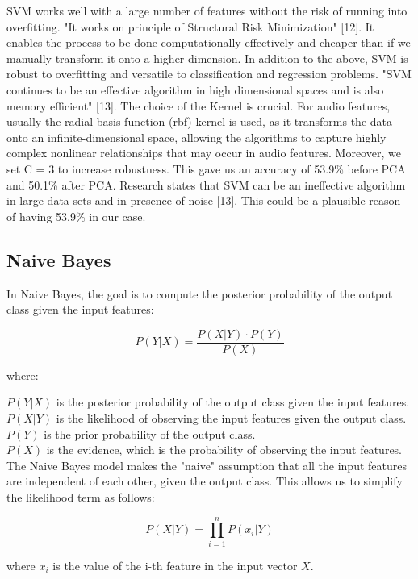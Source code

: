 \documentclass[conference]{IEEEtran}
\begin{document}
SVM works well with a large number of features without the risk of running into overfitting. "It works on principle of Structural Risk Minimization" [12]. It enables the process to be done computationally effectively and cheaper than if we manually transform it onto a higher dimension. In addition to the above, SVM is robust to overfitting and versatile to classification and regression problems.
"SVM continues to be an effective algorithm in high dimensional spaces and is also memory efficient" [13].
The choice of the Kernel is crucial. For audio features, usually the radial-basis function (rbf) kernel is used, as it transforms the data onto an infinite-dimensional space, allowing the algorithms to capture highly complex nonlinear relationships that may occur in audio features. Moreover, we set C = 3 to increase robustness. This gave us an accuracy of 53.9\% before PCA and 50.1\% after PCA.
Research states that SVM can be an ineffective algorithm in large data sets and in presence of noise [13]. This could be a plausible reason of having 53.9\% in our case.

\subsection{Naive Bayes}
In Naive Bayes, the goal is to compute the posterior probability of the output class given the input features:

\begin{equation}
P(Y|X) = \frac{P(X|Y) \cdot P(Y)}{P(X)}
\end{equation}

where:

$P(Y|X)$ is the posterior probability of the output class given the input features. \\
$P(X|Y)$ is the likelihood of observing the input features given the output class. \\
$P(Y)$ is the prior probability of the output class. \\ 
$P(X)$ is the evidence, which is the probability of observing the input features. \\
The Naive Bayes model makes the "naive" assumption that all the input features are independent  of each other, given the output class. This allows us to simplify the likelihood term as follows:

\begin{equation}
P(X|Y) = \prod_{i=1}^{n} P(x_i|Y)
\end{equation}

where $x_i$ is the value of the i-th feature in the input vector $X$.
\end{document}
